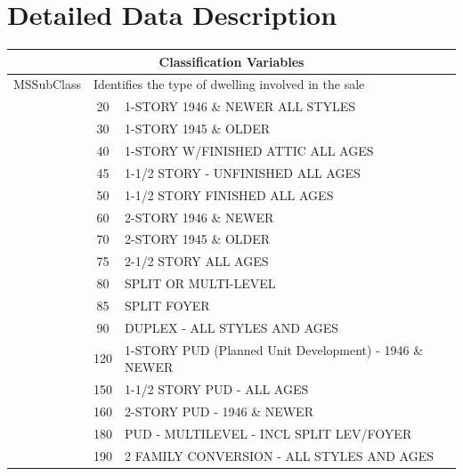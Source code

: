 \documentclass[11pt]{scrartcl} %
\begin{document}
\pagebreak
\section{Detailed Data Description}
\label{sec:DataDescription}
\begin{center}
\begin{tabular}{c c c c c c}
\hline
\multicolumn{6}{|c|}{Classification Variables}\\
\hline
\multicolumn{2}{|c}{MSSubClass} & \multicolumn{4}{l|}{Identifies the type of dwelling involved in the sale}\\ \multicolumn{2}{|c}{} & \multicolumn{1}{c}{20} & \multicolumn{3}{l|}{1-STORY 1946 \& NEWER ALL STYLES}\\
\multicolumn{2}{|c}{} & \multicolumn{1}{c}{30} & \multicolumn{3}{l|}{1-STORY 1945 \& OLDER}\\
\multicolumn{2}{|c}{} & \multicolumn{1}{c}{40} & \multicolumn{3}{l|}{1-STORY W/FINISHED ATTIC ALL AGES}\\
\multicolumn{2}{|c}{} & \multicolumn{1}{c}{45} & \multicolumn{3}{l|}{1-1/2 STORY - UNFINISHED ALL AGES}\\
\multicolumn{2}{|c}{} & \multicolumn{1}{c}{50} & \multicolumn{3}{l|}{1-1/2 STORY FINISHED ALL AGES}\\
\multicolumn{2}{|c}{} & \multicolumn{1}{c}{60} & \multicolumn{3}{l|}{2-STORY 1946 \& NEWER}\\
\multicolumn{2}{|c}{} & \multicolumn{1}{c}{70} & \multicolumn{3}{l|}{2-STORY 1945 \& OLDER}\\
\multicolumn{2}{|c}{} & \multicolumn{1}{c}{75} & \multicolumn{3}{l|}{2-1/2 STORY ALL AGES}\\
\multicolumn{2}{|c}{} & \multicolumn{1}{c}{80} & \multicolumn{3}{l|}{SPLIT OR MULTI-LEVEL}\\
\multicolumn{2}{|c}{} & \multicolumn{1}{c}{85} & \multicolumn{3}{l|}{SPLIT FOYER}\\
\multicolumn{2}{|c}{} & \multicolumn{1}{c}{90} & \multicolumn{3}{l|}{DUPLEX - ALL STYLES AND AGES}\\
\multicolumn{2}{|c}{} & \multicolumn{1}{c}{120} & \multicolumn{3}{l|}{1-STORY PUD (Planned Unit Development) - 1946 \& NEWER}\\
\multicolumn{2}{|c}{} & \multicolumn{1}{c}{150} & \multicolumn{3}{l|}{1-1/2 STORY PUD - ALL AGES}\\
\multicolumn{2}{|c}{} & \multicolumn{1}{c}{160} & \multicolumn{3}{l|}{2-STORY PUD - 1946 \& NEWER}\\
\multicolumn{2}{|c}{} & \multicolumn{1}{c}{180} & \multicolumn{3}{l|}{PUD - MULTILEVEL - INCL SPLIT LEV/FOYER}\\
\multicolumn{2}{|c}{} & \multicolumn{1}{c}{190} & \multicolumn{3}{l|}{2 FAMILY CONVERSION - ALL STYLES AND AGES}\\
\hline
\end{tabular}
\end{center}
\end{document}

